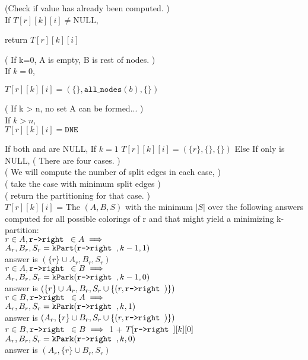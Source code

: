 \documentclass[11pt]{article}
\begin{document}
\begin{indentmore}
    (Check if value has already been computed. )\\
    If $T[r][k][i] \neq \text{NULL}$,

       \begin{indentmore}
       return $T[r][k][i]$
       \end{indentmore}

    ( If k=0, A is empty, B is rest of nodes. )\\
    If $k = 0$,
       \begin{indentmore}
       $T[r][k][i] = (\{\}, {\mathtt{all\_nodes}(b)}, \{\})$
       \end{indentmore}

    ( If k > n, no set A can be formed... )\\
    If $k > n$,\\
       $T[r][k][i] = \mathtt{DNE}$

    If both \rleft and \rright are NULL,
        If $k=1$
            $T[r][k][i] = (\{r\}, \{\}, \{\})$
        Else
    If only \rleft is NULL,
        ( There are four cases. )\\
        ( We will compute the number of split edges in each case, )\\
        ( take the case with minimum split edges )\\
        ( return the partitioning for that case. )\\
        $T[r][k][i]$ = The $(A,B,S)$ with the minimum $|S|$ over the following answers computed for all possible colorings of r and \rright that might yield a minimizing k-partition:\\
          $r \in A, \texttt{r->right } \in A \implies $\\
            $A_r, B_r, S_r = \mathtt{kPart}(\texttt{r->right },k-1,1)$\\
            answer is $(\{r\} \cup A_r, B_r, S_r)$\\
          $r \in A, \texttt{r->right } \in B \implies $\\
            $A_r, B_r, S_r = \mathtt{kPark}(\texttt{r->right },k-1,0)$\\
            answer is $(\{r\} \cup A_r, B_r, S_r \cup \{(r, \texttt{r->right })\})$\\
          $r \in B, \texttt{r->right } \in A \implies $\\
            $A_r, B_r, S_r = \mathtt{kPark}(\texttt{r->right },k,1)$\\
            answer is $(A_r,\{r\} \cup B_r, S_r \cup \{(r, \texttt{r->right })\})$\\
          $r \in B, \texttt{r->right } \in B \implies $ 1 + $T[\texttt{r->right }][k][0]$\\
            $A_r, B_r, S_r = \mathtt{kPark}(\texttt{r->right },k,0)$\\
            answer is $(A_r,\{r\} \cup B_r, S_r)$


\end{indentmore}
\end{document}
